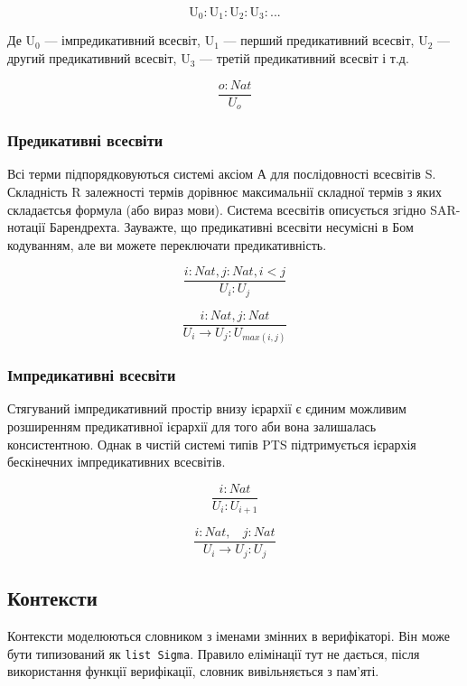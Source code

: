 $$
    \mathrm{U_0} : \mathrm{U}_1 : \mathrm{U}_2 : \mathrm{U}_3 : ...
$$

Де $\mathrm{U_0}$ --- імпредикативний всесвіт,
   $\mathrm{U_1}$ --- перший предикативний всесвіт,
   $\mathrm{U_2}$ --- другий предикативний всесвіт,
   $\mathrm{U_3}$ --- третій предикативний всесвіт і т.д.

\begin{equation}
\tag{S}
\dfrac
{o : Nat}
{U_o}
\end{equation}

\subsubsection*{Предикативні всесвіти}
Всі терми підпорядковуються системі аксіом А для послідовності всесвітів S.
Складність R залежності термів дорівнює максимальнії складної термів з
яких складаєтсья формула (або вираз мови). Система всесвітів описується
згідно SAR-нотації Барендрехта. Зауважте, що предикативні всесвіти
несумісні в Бом кодуванням, але ви можете переключати предикативність.

\[
\tag{$A_1$}
\dfrac{i: Nat, j: Nat, i < j}{U_i : U_j}
\]

\[
\tag{$R_1$}
\dfrac{i : Nat, j : Nat}{U_i \rightarrow U_j : U_{max(i,j)} }
\]

\subsubsection*{Імпредикативні всесвіти}
Стягуваний імпредикативний простір внизу ієрархії є єдиним можливим розширенням
предикативної ієрархії для того аби вона залишалась консистентною. Однак
в чистій системі типів PTS підтримується ієрархія бескінечних імпредикативних всесвітів.

\begin{equation}
\tag{$A_2$}
\dfrac
{i: Nat}
{U_i : U_{i+1}}
\end{equation}

\begin{equation}
\tag{$R_2$}
\dfrac
{i : Nat,\ \ \ \ j : Nat}
{U_i \rightarrow U_{j} : U_{j}}
\end{equation}

\subsection*{Контексти}

Контексти моделюються словником з іменами змінних в верифікаторі.
Він може бути типизований як \lstinline{list Sigma}.
Правило елімінації тут не дається, після використання функції верифікації,
словник вивільняється з пам'яті.


